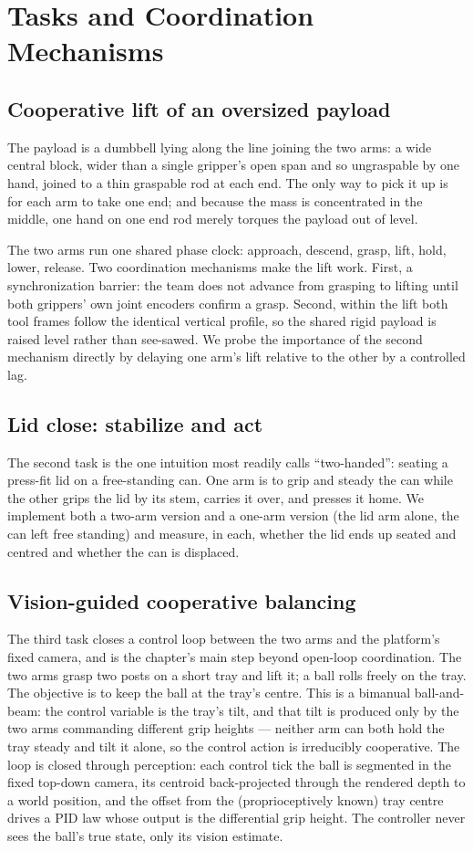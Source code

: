 \documentclass[runningheads]{llncs}
\begin{document}
\section{Tasks and Coordination Mechanisms}
\subsection{Cooperative lift of an oversized payload}
The payload is a dumbbell lying along the line joining the two arms: a wide central block, wider than a single gripper's open span and so ungraspable by one hand, joined to a thin graspable rod at each end. The only way to pick it up is for each arm to take one end; and because the mass is concentrated in the middle, one hand on one end rod merely torques the payload out of level.

The two arms run one shared phase clock: approach, descend, grasp, lift, hold, lower, release. Two coordination mechanisms make the lift work. First, a synchronization barrier: the team does not advance from grasping to lifting until both grippers' own joint encoders confirm a grasp. Second, within the lift both tool frames follow the identical vertical profile, so the shared rigid payload is raised level rather than see-sawed. We probe the importance of the second mechanism directly by delaying one arm's lift relative to the other by a controlled lag.

\subsection{Lid close: stabilize and act}
The second task is the one intuition most readily calls ``two-handed'': seating a press-fit lid on a free-standing can. One arm is to grip and steady the can while the other grips the lid by its stem, carries it over, and presses it home. We implement both a two-arm version and a one-arm version (the lid arm alone, the can left free standing) and measure, in each, whether the lid ends up seated and centred and whether the can is displaced.

\subsection{Vision-guided cooperative balancing}
The third task closes a control loop between the two arms and the platform's fixed camera, and is the chapter's main step beyond open-loop coordination. The two arms grasp two posts on a short tray and lift it; a ball rolls freely on the tray. The objective is to keep the ball at the tray's centre. This is a bimanual ball-and-beam: the control variable is the tray's tilt, and that tilt is produced only by the two arms commanding different grip heights --- neither arm can both hold the tray steady and tilt it alone, so the control action is irreducibly cooperative. The loop is closed through perception: each control tick the ball is segmented in the fixed top-down camera, its centroid back-projected through the rendered depth to a world position, and the offset from the (proprioceptively known) tray centre drives a PID law whose output is the differential grip height. The controller never sees the ball's true state, only its vision estimate.
\end{document}
